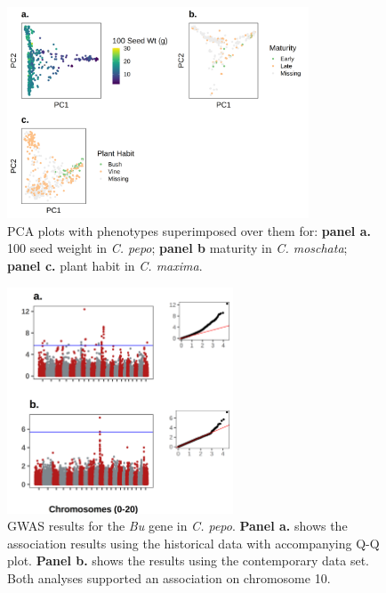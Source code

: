 \documentclass[utf8]{FrontiersinHarvard} %
\begin{document}
\clearpage

\begin{figure}[h]
	\begin{center}
		\includegraphics[width=0.8\textwidth]{../final_figures/07_fig.png}
	\end{center}
	\caption{ PCA plots with phenotypes superimposed over them for: \textbf{panel a.}  100 seed weight in \textit{C. pepo}; \textbf{panel b} maturity in \textit{C. moschata}; \textbf{panel c.} plant habit in \textit{C. maxima}.\label{fig:7}}
\end{figure}

\clearpage

\begin{figure}[h]
	\begin{center}
		\includegraphics[width=0.6\textwidth]{../final_figures/08_fig.png}
	\end{center}
	\caption{GWAS results for the \textit{Bu} gene in \textit{C. pepo}. \textbf{Panel a.} shows the association results using the historical data with accompanying Q-Q plot. \textbf{Panel b.} shows the results using the contemporary data set. Both analyses supported an association on chromosome 10. \label{fig:8}}
\end{figure}
\end{document}
